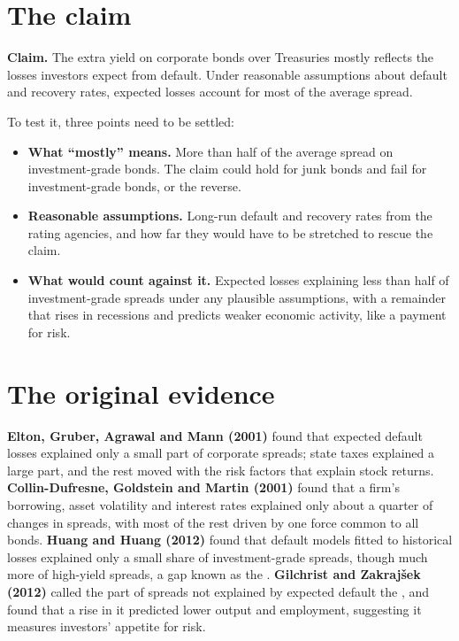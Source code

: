 \section{The claim}
\label{sec:15-claim}

\begin{callout}
\textbf{Claim.} The extra yield on corporate bonds over Treasuries mostly reflects the losses investors expect from default. Under reasonable assumptions about default and recovery rates, expected losses account for most of the average spread.
\end{callout}

To test it, three points need to be settled:

\begin{itemize}
  \item \textbf{What ``mostly'' means.} More than half of the average spread on investment-grade bonds. The claim could hold for junk bonds and fail for investment-grade bonds, or the reverse.
  \item \textbf{Reasonable assumptions.} Long-run default and recovery rates from the rating agencies, and how far they would have to be stretched to rescue the claim.
  \item \textbf{What would count against it.} Expected losses explaining less than half of investment-grade spreads under any plausible assumptions, with a remainder that rises in recessions and predicts weaker economic activity, like a payment for risk.
\end{itemize}

\section{The original evidence}
\label{sec:15-evidence}

\textbf{Elton, Gruber, Agrawal and Mann (2001)} found that expected default losses explained only a small part of corporate spreads; state taxes explained a large part, and the rest moved with the risk factors that explain stock returns. \textbf{Collin-Dufresne, Goldstein and Martin (2001)} found that a firm's borrowing, asset volatility and interest rates explained only about a quarter of changes in spreads, with most of the rest driven by one force common to all bonds. \textbf{Huang and Huang (2012)} found that default models fitted to historical losses explained only a small share of investment-grade spreads, though much more of high-yield spreads, a gap known as the . \textbf{Gilchrist and Zakraj\v{s}ek (2012)} called the part of spreads not explained by expected default the , and found that a rise in it predicted lower output and employment, suggesting it measures investors' appetite for risk.

